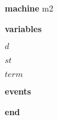 \begin{block}
  \item   \textbf{machine} m2
  \item   \textbf{variables}
  \begin{block}
    \item   $d$
    \item   $st$
    \item   $term$
  \end{block}
  \item   
  \item   
  \item   
  \item   \textbf{events}
  \begin{block}
    \item   
    \item   
    \item   
    \item   
  \end{block}
  \item   \textbf{end} \\
\end{block}
